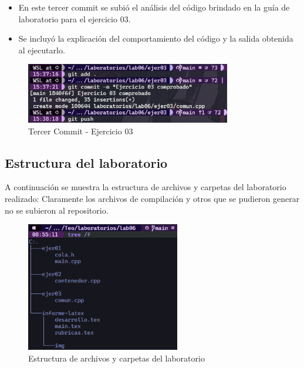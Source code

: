 \begin{itemize}
    \item En este tercer commit se subió el análisis del código brindado en la guía de laboratorio para el ejercicio 03.
    \item Se incluyó la explicación del comportamiento del código y la salida obtenida al ejecutarlo.
\end{itemize}

\begin{figure}[H]
    \centering
    \includegraphics[width=0.8\textwidth]{img/Commit03.png}
    \caption{Tercer Commit - Ejercicio 03}
    \label{fig:commit3}
\end{figure}



\subsection {Estructura del laboratorio}

A continuación se muestra la estructura de archivos y carpetas del laboratorio realizado:
Claramente los archivos de compilación y otros que se pudieron generar no se subieron al repositorio.

\begin{figure}[H]
    \centering
    \includegraphics[width=0.6\textwidth]{img/Estructura.png}
    \caption{Estructura de archivos y carpetas del laboratorio}
    \label{fig:estructura}
\end{figure}




